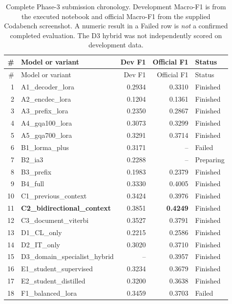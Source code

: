 \begin{longtable}{@{}r p{.44\linewidth} r r p{.14\linewidth}@{}}
\caption{Complete Phase-3 submission chronology. Development Macro-F1 is from the executed notebook and official Macro-F1 from the supplied Codabench screenshot. A numeric result in a Failed row is \emph{not} a confirmed completed evaluation. The D3 hybrid was not independently scored on development data.}\label{tab:p3-all}\\
\toprule
\# & Model or variant & Dev F1 & Official F1 & Status \\
\midrule\endfirsthead
\toprule
\# & Model or variant & Dev F1 & Official F1 & Status \\
\midrule\endhead
1 & A1\_\allowbreak decoder\_\allowbreak lora & 0.2934 & 0.3310 & Finished \\
2 & A2\_\allowbreak encdec\_\allowbreak lora & 0.1204 & 0.1361 & Finished \\
3 & A3\_\allowbreak prefix\_\allowbreak lora & 0.2350 & 0.2867 & Finished \\
4 & A4\_\allowbreak gqa100\_\allowbreak lora & 0.3073 & 0.3299 & Finished \\
5 & A5\_\allowbreak gqa700\_\allowbreak lora & 0.3291 & 0.3714 & Finished \\
6 & B1\_\allowbreak lorma\_\allowbreak plus & 0.3171 & -- & Failed \\
7 & B2\_\allowbreak ia3 & 0.2288 & -- & Preparing \\
8 & B3\_\allowbreak prefix & 0.1983 & 0.2379 & Finished \\
9 & B4\_\allowbreak full & 0.3330 & 0.4005 & Finished \\
10 & C1\_\allowbreak previous\_\allowbreak context & 0.3424 & 0.3976 & Finished \\
11 & \textbf{C2\_\allowbreak bidirectional\_\allowbreak context} & 0.3851 & \textbf{0.4249} & Finished \\
12 & C3\_\allowbreak document\_\allowbreak viterbi & 0.3527 & 0.3791 & Finished \\
13 & D1\_\allowbreak CL\_\allowbreak only & 0.2215 & 0.2586 & Finished \\
14 & D2\_\allowbreak IT\_\allowbreak only & 0.3020 & 0.3710 & Finished \\
15 & D3\_\allowbreak domain\_\allowbreak specialist\_\allowbreak hybrid & -- & 0.3957 & Finished \\
16 & E1\_\allowbreak student\_\allowbreak supervised & 0.3234 & 0.3679 & Finished \\
17 & E2\_\allowbreak student\_\allowbreak distilled & 0.3200 & 0.3638 & Finished \\
18 & F1\_\allowbreak balanced\_\allowbreak lora & 0.3459 & 0.3703 & Failed \\
\bottomrule
\end{longtable}
